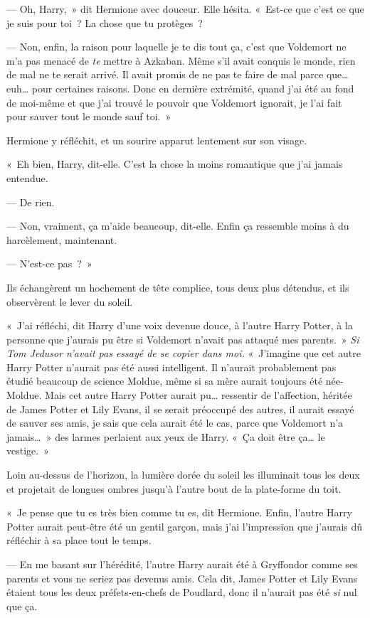 --- Oh, Harry,~» dit Hermione avec douceur.
Elle hésita.
«~Est-ce que c'est ce que je suis pour toi~?
La chose que tu protèges~?

--- Non, enfin, la raison pour laquelle je te dis tout ça, c'est que Voldemort ne m'a pas menacé de \emph{te} mettre à Azkaban.
Même s'il avait conquis le monde, rien de mal ne te serait arrivé.
Il avait promis de ne pas te faire de mal parce que… euh… pour certaines raisons.
Donc en dernière extrémité, quand j'ai été au fond de moi-même et que j'ai trouvé le pouvoir que Voldemort ignorait, je l'ai fait pour sauver tout le monde sauf toi.~»

Hermione y réfléchit, et un sourire apparut lentement sur son visage.

«~Eh bien, Harry, dit-elle.
C'est la chose la moins romantique que j'ai jamais entendue.

--- De rien.

--- Non, vraiment, ça m'aide beaucoup, dit-elle.
Enfin ça ressemble moins à du harcèlement, maintenant.

--- N'est-ce pas~?~»

Ils échangèrent un hochement de tête complice, tous deux plus détendus, et ils observèrent le lever du soleil.

«~J'ai réfléchi, dit Harry d'une voix devenue douce, à l'autre Harry Potter, à la personne que j'aurais pu être si Voldemort n'avait pas attaqué mes parents.~»
\emph{Si Tom Jedusor n'avait pas essayé de se copier dans moi.} «~J'imagine que cet autre Harry Potter n'aurait pas été aussi intelligent.
Il n'aurait probablement pas étudié beaucoup de science Moldue, même si sa mère aurait toujours été née-Moldue.
Mais cet autre Harry Potter aurait pu… ressentir de l'affection, héritée de James Potter et Lily Evans, il se serait préoccupé des autres, il aurait essayé de sauver ses amis, je sais que cela aurait été le cas, parce que Voldemort n'a jamais…~»
des larmes perlaient aux yeux de Harry.
«~Ça doit être ça… le vestige.~»

Loin au-dessus de l'horizon, la lumière dorée du soleil les illuminait tous les deux et projetait de longues ombres jusqu'à l'autre bout de la plate-forme du toit.

«~Je pense que tu es très bien comme tu es, dit Hermione.
Enfin, l'autre Harry Potter aurait peut-être été un gentil garçon, mais j'ai l'impression que j'aurais dû réfléchir à sa place tout le temps.

--- En me basant sur l'hérédité, l'autre Harry aurait été à Gryffondor comme ses parents et vous ne seriez pas devenus amis.
Cela dit, James Potter et Lily Evans étaient tous les deux préfets-en-chefs de Poudlard, donc il n'aurait pas été \emph{si} nul que ça.

